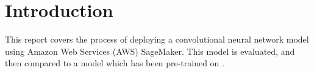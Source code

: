 \section{Introduction}

This report covers the process of deploying a convolutional neural network model using Amazon Web Services (AWS) SageMaker. This model is evaluated, and then compared to a model which has been pre-trained on . 